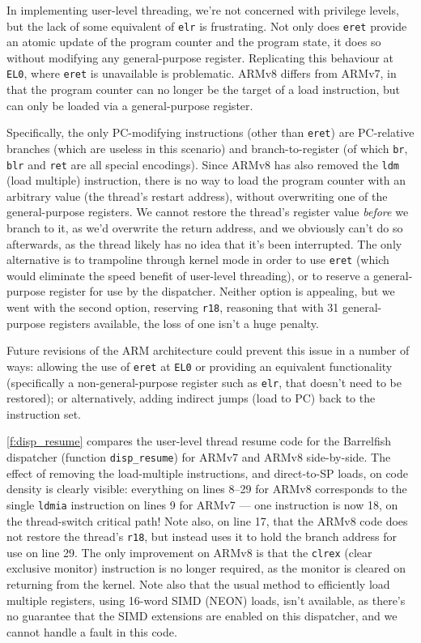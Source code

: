 \documentclass[a4paper,twoside]{report}
\begin{document}
In implementing user-level threading, we're not concerned with privilege
levels, but the lack of some equivalent of \texttt{elr} is frustrating. Not
only does \texttt{eret} provide an atomic update of the program counter and
the program state, it does so without modifying any general-purpose register.
Replicating this behaviour at \texttt{EL0}, where \texttt{eret} is unavailable
is problematic. ARMv8 differs from ARMv7, in that the program counter can no
longer be the target of a load instruction, but can only be loaded via a
general-purpose register.

Specifically, the only PC-modifying instructions (other than \texttt{eret})
are PC-relative branches (which are useless in this scenario) and
branch-to-register (of which \texttt{br}, \texttt{blr} and \texttt{ret} are
all special encodings). Since ARMv8 has also removed the \texttt{ldm} (load
multiple) instruction, there is no way to load the program counter with an
arbitrary value (the thread's restart address), without overwriting one of the
general-purpose registers. We cannot restore the thread's register value
\emph{before} we branch to it, as we'd overwrite the return address, and we
obviously can't do so afterwards, as the thread likely has no idea that it's
been interrupted. The only alternative is to trampoline through kernel mode in
order to use \texttt{eret} (which would eliminate the speed benefit of
user-level threading), or to reserve a general-purpose register for use by the
dispatcher. Neither option is appealing, but we went with the second option,
reserving \texttt{r18}, reasoning that with 31 general-purpose registers
available, the loss of one isn't a huge penalty.

Future revisions of the ARM architecture could prevent this issue in a number
of ways: allowing the use of \texttt{eret} at \texttt{EL0} or providing an
equivalent functionality (specifically a non-general-purpose register such as
\texttt{elr}, that doesn't need to be restored); or alternatively, adding
indirect jumps (load to PC) back to the instruction set.

\autoref{f:disp_resume} compares the user-level thread resume code for the
Barrelfish dispatcher (function \texttt{disp\_resume}) for ARMv7 and ARMv8
side-by-side. The effect of removing the load-multiple instructions, and
direct-to-SP loads, on code density is clearly visible: everything on lines
8--29 for ARMv8 corresponds to the single \texttt{ldmia} instruction on lines
9 for ARMv7 --- one instruction is now 18, on the thread-switch critical path!
Note also, on line 17, that the ARMv8 code does not restore the thread's
\texttt{r18}, but instead uses it to hold the branch address for use on line
29. The only improvement on ARMv8 is that the \texttt{clrex} (clear exclusive
monitor) instruction is no longer required, as the monitor is cleared on
returning from the kernel. Note also that the usual method to efficiently load
multiple registers, using 16-word SIMD (NEON) loads, isn't available, as
there's no guarantee that the SIMD extensions are enabled on this dispatcher,
and we cannot handle a fault in this code.
\end{document}
